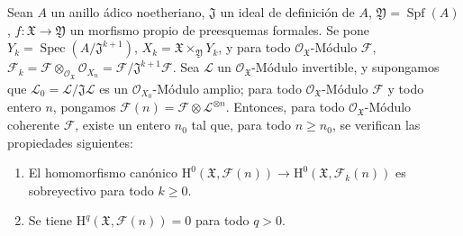 \begin{proposition}[5.2.3]
\label{III.5.2.3-fr}
Sean $A$ un anillo ádico noetheriano, $\mathfrak J$ un ideal de definición de
$A$, $\mathfrak Y=\operatorname{Spf}(A)$,
$f:\mathfrak X\to\mathfrak Y$ un morfismo propio de preesquemas formales. Se pone
$Y_k=\operatorname{Spec}(A/\mathfrak J^{k+1})$,
$X_k=\mathfrak X\times_{\mathfrak Y}Y_k$, y para todo
$\mathcal O_{\mathfrak X}$-Módulo $\mathcal F$,
$\mathcal F_k=\mathcal F\otimes_{\mathcal O_{\mathfrak X}}\mathcal O_{X_n}
=\mathcal F/\mathfrak J^{k+1}\mathcal F$.
Sea $\mathcal L$ un $\mathcal O_{\mathfrak X}$-Módulo invertible, y supongamos que
$\mathcal L_0=\mathcal L/\mathfrak J\mathcal L$ es un
$\mathcal O_{X_0}$-Módulo amplio; para todo $\mathcal O_{\mathfrak X}$-Módulo
$\mathcal F$ y todo entero $n$, pongamos
$\mathcal F(n)=\mathcal F\otimes\mathcal L^{\otimes n}$. Entonces, para todo
$\mathcal O_{\mathfrak X}$-Módulo coherente $\mathcal F$, existe un entero $n_0$
tal que, para todo $n\geq n_0$, se verifican las propiedades siguientes:
\begin{enumerate}
\item[\textup{(i)}] El homomorfismo canónico
$\mathrm H^0(\mathfrak X,\mathcal F(n))\to
\mathrm H^0(\mathfrak X,\mathcal F_k(n))$ es sobreyectivo para todo $k\geq0$.
\item[\textup{(ii)}] Se tiene $\mathrm H^q(\mathfrak X,\mathcal F(n))=0$ para todo $q>0$.
\end{enumerate}
\end{proposition}

